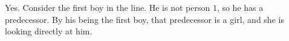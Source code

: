 Yes. Consider the first boy in the line. He is not person $1$, so he has a predecessor. By his being the first boy, that predecessor is a girl, and she is looking directly at him.
